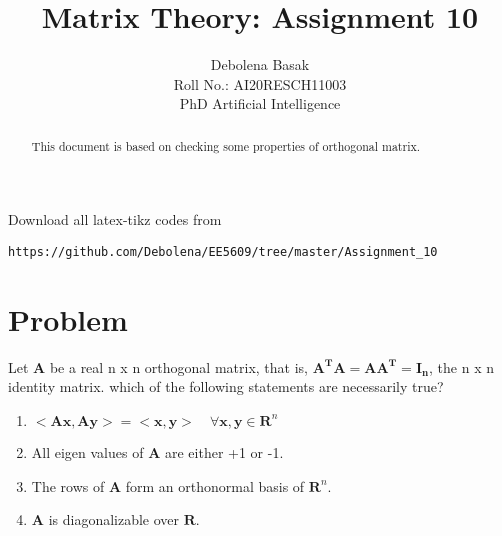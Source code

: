 \documentclass[journal,12pt,twocolumn]{IEEEtran}
\begin{document}
\makeatletter
{}
\makeatother
\let\StandardTheFigure\thefigure
\let\vec\mathbf
\renewcommand{\thefigure}{\theproblem}
\def\putbox#1#2#3{\makebox[0in][l]{\makebox[#1][l]{}\raisebox{\baselineskip}[0in][0in]{\raisebox{#2}[0in][0in]{#3}}}}
     \def\rightbox#1{\makebox[0in][r]{#1}}
     \def\centbox#1{\makebox[0in]{#1}}
     \def\topbox#1{\raisebox{-\baselineskip}[0in][0in]{#1}}
     \def\midbox#1{\raisebox{-0.5\baselineskip}[0in][0in]{#1}}
\vspace{3cm}
\title{Matrix Theory: Assignment 10}
\author{Debolena Basak\\ Roll No.: AI20RESCH11003\\ PhD Artificial Intelligence}

\maketitle
\newpage
\bigskip
\renewcommand{\thefigure}{\theenumi}
\renewcommand{\thetable}{\theenumi}


\begin{abstract}
This document is based on checking some properties of orthogonal matrix.
\end{abstract}

%
Download all latex-tikz codes from 
%
\begin{lstlisting}
https://github.com/Debolena/EE5609/tree/master/Assignment_10
\end{lstlisting}
%
\section{Problem}
Let $\vec A$ be a real n x n orthogonal matrix, that is, $\vec{A^TA=AA^T=I_n}$, the n x n identity matrix. which of the following statements are necessarily true?
\begin{enumerate}
    \item $ \vec{<Ax,Ay> =  <x,y>}\quad \forall \vec{x,y}\in \vec R^n $
    \item All eigen values of $\vec A $ are either +1 or -1.
    \item The rows of $\vec A$ form an orthonormal basis of $\vec R^n.$
    \item $\vec A$ is diagonalizable over $\vec R.$ 
\end{enumerate}
\end{document}
